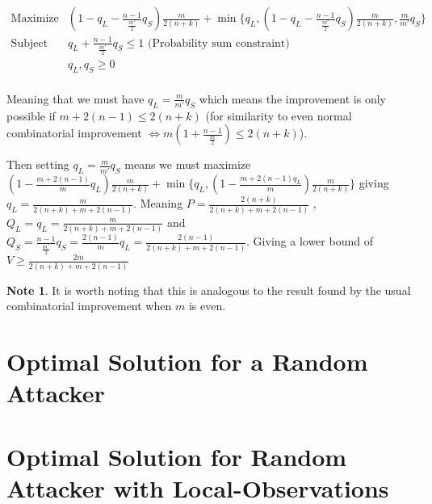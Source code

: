 \documentclass[a4paper,10pt]{article}
\theoremstyle{definition}
\theoremstyle{definition}
\theoremstyle{remark}
\theoremstyle{definition}
\newtheorem*{note}{Note}
\begin{document}
$$\begin{array}{cc}
\text{Maximize} & (1-q_{L}-\frac{n-1}{ \frac{m'}{2}}q_{S}) \frac{m}{2(n+k)} + \min \{ q_{L}, (1-q_{L}-\frac{n-1}{\frac{m'}{2}}q_{S}) \frac{m}{2(n+k)} , \frac{m}{m'}q_{S} \}\\
\text{Subject to } & q_{L}+\frac{n-1}{\frac{m'}{2}}q_{S} \leq 1 \text{  (Probability sum constraint)} \\
     & q_{L},q_{S} \geq 0 \\
\end{array} $$

Meaning that we must have $q_{L}=\frac{m}{m'}q_{S}$ which means the improvement is only possible if $m+2(n-1) \leq 2(n+k)$ (for similarity to even normal combinatorial improvement $\iff m(1+\frac{n-1}{\frac{m}{2}}) \leq 2(n+k)$). 

Then setting $q_{L}=\frac{m}{m'}q_{S}$ means we must maximize $(1-\frac{m+2(n-1)}{m}q_{L})\frac{m}{2(n+k)}+\min\{ q_{L}, (1-\frac{m+2(n-1)q_{L}}{m})\frac{m}{2(n+k)} \}$ giving $q_{L}=\frac{m}{2(n+k)+m+2(n-1)}$. Meaning $P=\frac{2(n+k)}{2(n+k)+m+2(n-1)}$ , $Q_{L}=q_{L}=\frac{m}{2(n+k)+m+2(n-1)}$ and $Q_{S}=\frac{n-1}{\frac{m'}{2}}q_{S}=\frac{2(n-1)}{m}q_{L}=\frac{2(n-1)}{2(n+k)+m+2(n-1)}$. Giving a lower bound of $V \geq \frac{2m}{2(n+k)+m+2(n-1)}$

\begin{note}
It is worth noting that this is analogous to the result found by the usual combinatorial improvement when $m$ is even.
\end{note}



\section{Optimal Solution for a Random Attacker}
\label{Appendix:Optimal Solution for a Random Attacker}

\section{Optimal Solution for Random Attacker with Local-Observations}
\label{Appendix:Optimal Solution for Random Attacker with Local-Observations}
\end{document}
